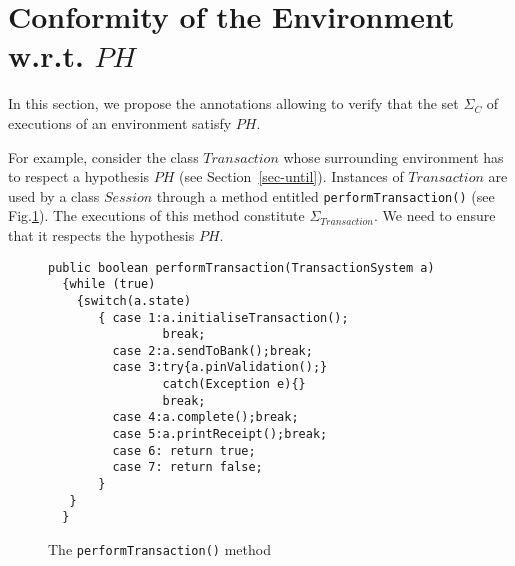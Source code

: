\section{Conformity of the Environment w.r.t. $PH$}
\label{sec-verif}


In this section, we propose the annotations allowing to  
verify that the set $\Sigma_C$ of executions of an environment satisfy $PH$.

\begin{normalsize}

  For example, consider the class $Transaction$ whose surrounding
  environment has to respect a hypothesis $PH$ (see
  Section~\ref{sec-until}). Instances of $Transaction$ are used by a class
  $Session$ through a method entitled \texttt{performTransaction()} (see
  Fig.\ref{fig-perform}).  The executions of this method constitute
  $\Sigma_{Transaction}$. We need to ensure that it respects
  the hypothesis $PH$.




\end{normalsize}

\begin{figure}
{\scriptsize
\begin{multicols}{2}
\begin{verbatim}
public boolean performTransaction(TransactionSystem a)
  {while (true)   
    {switch(a.state)
       { case 1:a.initialiseTransaction();                  
                break;            
         case 2:a.sendToBank();break;
         case 3:try{a.pinValidation();}
                catch(Exception e){}
                break;
         case 4:a.complete();break;                   
         case 5:a.printReceipt();break;                                      
         case 6: return true;
         case 7: return false;
       }
   }
  }
\end{verbatim}
\end{multicols}
}
\caption{The \texttt{performTransaction()} method}\label{fig-perform}
\end{figure}

